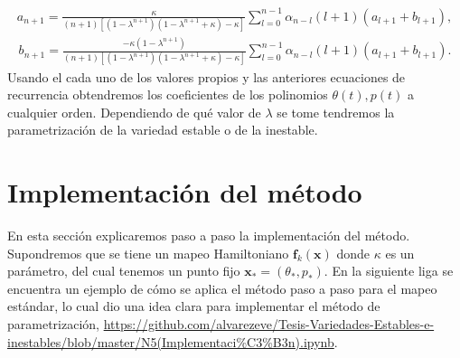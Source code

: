 \begin{eqnarray}
a_{n+1}=\frac{\kappa}{(n+1)[(1-\lambda^{n+1})(1-\lambda^{n+1}+\kappa)-\kappa]}\sum_{l=0}^{n-1}\alpha_{n-l}(l+1)(a_{l+1}+b_{l+1}),
\end{eqnarray}
\begin{eqnarray}
b_{n+1}=\frac{-\kappa(1-\lambda^{n+1})}{(n+1)[(1-\lambda^{n+1})(1-\lambda^{n+1}+\kappa)-\kappa]}\sum_{l=0}^{n-1}\alpha_{n-l}(l+1)(a_{l+1}+b_{l+1}).
\end{eqnarray}
Usando el cada uno de los valores propios y las anteriores ecuaciones de recurrencia obtendremos los coeficientes de los polinomios $\theta(t),p(t)$ a cualquier orden. Dependiendo de qué valor de $\lambda$ se tome tendremos la parametrización de la variedad estable o de la inestable.\\






\section{Implementación del método}
En esta sección explicaremos paso a paso la implementación del método. Supondremos que se tiene un mapeo Hamiltoniano $\mathbf{f}_{k}(\mathbf{x})$ donde $\kappa$  es un parámetro, del cual tenemos un punto fijo $\mathbf{x}_{*}=(\theta_{*},p_{*})$. En la siguiente liga se encuentra un ejemplo de cómo se aplica el método paso a paso para el mapeo estándar, lo cual dio una idea clara para implementar el método de parametrización, \url{https://github.com/alvarezeve/Tesis-Variedades-Estables-e-inestables/blob/master/N5(Implementaci%C3%B3n).ipynb}. 
\linebreak


